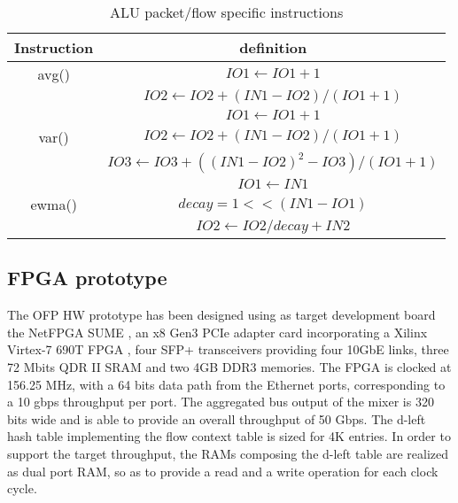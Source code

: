 \documentclass{sig-alternate}
\begin{document}
\begin{table}[t]
\vspace{-.6em}
\centering
\small
\begin{tabular}{|c|c|}
  \hline
 Instruction & definition \\
\hline
avg()  & $IO1 \leftarrow IO1+1$ \\
       & $IO2 \leftarrow IO2+(IN1-IO2)/(IO1+1)$\\
\hline
       & $IO1 \leftarrow IO1+1$\\
var()  & $IO2 \leftarrow IO2+(IN1-IO2)/(IO1+1)$\\
       & $IO3 \leftarrow IO3+((IN1-IO2)^2 -IO3)/(IO1+1)$\\
\hline
        & $IO1 \leftarrow IN1$ \\
ewma()  & $decay = 1<<(IN1-IO1)$ \\ 
		& $IO2 \leftarrow IO2/decay +IN2$ \\ 
\hline
\end{tabular}
      	  \vspace{-1em}
\caption{ALU packet/flow specific instructions}
      	  \vspace{-1em}
\label{T:specistr}
\end{table}

\subsection{FPGA prototype}
\label{s:proto}

The OFP HW prototype has been designed using as target development board the NetFPGA SUME \cite{sume}, an x8 Gen3 PCIe adapter card incorporating a Xilinx Virtex-7 690T FPGA \cite{V7},  four SFP+ transceivers providing four 10GbE links, three 72 Mbits QDR II SRAM and two 4GB DDR3 memories.
The FPGA is clocked at 156.25 MHz, with a 64 bits data path from the Ethernet ports, corresponding to a 10 gbps throughput per port. The aggregated bus output of the mixer is 320 bits wide and is able to provide an overall throughput of 50 Gbps. The d-left hash table implementing the flow context table is sized for 4K entries. In order to support the target throughput, the RAMs composing the d-left table are realized as dual port RAM, so as to provide a read and a write operation for each clock cycle.
\end{document}
